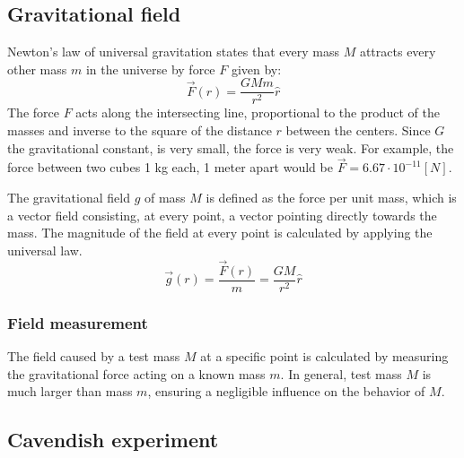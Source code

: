 \documentclass[\main/master.tex]{subfiles}
\begin{document}
\subsection{Gravitational field}
Newton's law of universal gravitation states that every mass $M$ attracts every other mass $m$ in the universe by force $F$ given by:
\begin{equation}
\overrightarrow{F}(r) = \frac{GMm}{r^2}\hat{r}    \label{eqn:gravitation_force}
\end{equation}
The force $F$ acts along the intersecting line, proportional to the product of the masses and inverse to the square of the distance $r$ between the centers. Since $G$ the gravitational constant, is very small, the force is very weak. For example, the force between two cubes 1 kg each, 1 meter apart would be $\overrightarrow{F} = 6.67\cdot10^{-11} [N]$.
\par\noindent
The gravitational field $g$ of mass $M$ is defined as the force per unit mass, which is a vector field consisting, at every point, a vector pointing directly towards the mass. The magnitude of the field at every point is calculated by applying the universal law. 
\begin{equation}
\overrightarrow{g}(r) = \frac{\overrightarrow{F}(r)}{m} = \frac{GM}{r^2}\hat{r}    \label{eqn:gravitation_field}
\end{equation}
\subsubsection{Field measurement}
\par\noindent
The field caused by a test mass $M$ at a specific point is calculated by measuring the gravitational force acting on a known mass $m$. In general, test mass $M$ is much larger than mass $m$, ensuring a negligible influence on the behavior of $M$.  

\subsection{Cavendish experiment}
\end{document}
